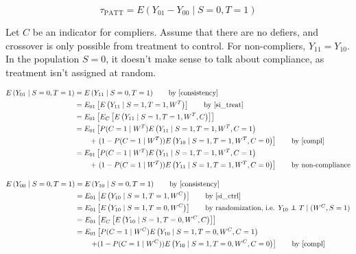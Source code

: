 \documentclass{article}
\newcommand{\pr}{P} %
\newcommand{\ex}{E} %
\newcommand\independent{\protect\mathpalette{\protect\independenT}{\perp}}
\def\independenT#1#2{\mathrel{\rlap{$#1#2$}\mkern2mu{#1#2}}}
\begin{document}
\begin{equation}
\tau_{\text{PATT}} = \ex\left( Y_{01} - Y_{00} \mid S=0, T=1\right)
\end{equation}

Let $C$ be an indicator for compliers.  Assume that there are no defiers, and crossover is only possible from treatment to control.  For non-compliers, $Y_{11} = Y_{10}$.  In the population $S=0$, it doesn't make sense to talk about compliance, as treatment isn't assigned at random.  

\begin{align*}
\ex\left(Y_{01} \mid S=0, T=1\right) &= \ex\left(Y_{11} \mid S=0, T=1\right) \tag*{by \eqref{consistency}} \\
&= \ex_{01}\left[  \ex\left(Y_{11} \mid S=1, T=1, W^T\right) \right] \tag*{by \eqref{si_treat}} \\
&= \ex_{01}\left[\ex_{C}\left[  \ex\left(Y_{11} \mid S=1, T=1, W^T, C\right) \right]\right]  \\
&= \ex_{01}\left[  \pr(C=1 \mid W^T) \ex\left(Y_{11} \mid S=1, T=1, W^T, C=1\right)\right. \\& \qquad+ \left.(1-\pr(C=1 \mid W^T))\ex\left(Y_{10} \mid S=1, T=1, W^T, C=0\right) \right]  \tag*{by \eqref{compl}} \\
&= \ex_{01}\left[  \pr(C=1 \mid W^T) \ex\left(Y_{11} \mid S=1, T=1, W^T, C=1\right)\right. \\& \qquad+ \left.(1-\pr(C=1 \mid W^T))\ex\left(Y_{11} \mid S=1, T=1, W^T, C=0\right) \right]  \tag*{by non-compliance} \\
\end{align*}

\begin{align*}
\ex\left(Y_{00} \mid S=0, T=1\right) &= \ex\left(Y_{10} \mid S=0, T=1\right) \tag*{by \eqref{consistency}} \\
&= \ex_{01}\left[  \ex\left(Y_{10} \mid S=1, T=1, W^C\right) \right] \tag*{by \eqref{si_ctrl}} \\
&= \ex_{01}\left[  \ex\left(Y_{10} \mid S=1, T=0, W^C\right) \right] \tag*{by randomization, i.e. $Y_{10} \independent T \mid (W^C, S=1)$} \\
&= \ex_{01}\left[ \ex_{C}\left[  \ex\left(Y_{10} \mid S=1, T=0, W^C, C\right) \right]\right] \\
&=  \ex_{01}\left[  \pr(C = 1\mid W^C) \ex\left(Y_{10} \mid S=1, T=0, W^C, C=1\right)\right. \\&\qquad \left. + (1-\pr(C=1 \mid W^C)) \ex\left(Y_{10} \mid S=1, T=0, W^C, C=0\right) \right]   \tag*{by \eqref{compl}} \\\\
\end{align*}
\end{document}
